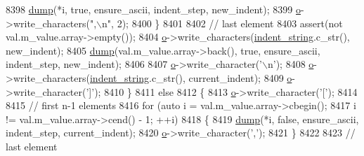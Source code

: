 \begin{DoxyCode}
8398                         \hyperlink{classnlohmann_1_1detail_1_1serializer_a95460ebd1a535a543e5a0ec52e00f48b}{dump}(*i, \textcolor{keyword}{true}, ensure\_ascii, indent\_step, new\_indent);
8399                         \hyperlink{classnlohmann_1_1detail_1_1serializer_acf3c88660d3cbc65fc71c4d84f2a9f59}{o}->write\_characters(\textcolor{stringliteral}{",\(\backslash\)n"}, 2);
8400                     \}
8401 
8402                     \textcolor{comment}{// last element}
8403                     assert(not val.m\_value.array->empty());
8404                     \hyperlink{classnlohmann_1_1detail_1_1serializer_acf3c88660d3cbc65fc71c4d84f2a9f59}{o}->write\_characters(\hyperlink{classnlohmann_1_1detail_1_1serializer_ae9268a10d88a5526e32735a55a132fc6}{indent\_string}.c\_str(), new\_indent);
8405                     \hyperlink{classnlohmann_1_1detail_1_1serializer_a95460ebd1a535a543e5a0ec52e00f48b}{dump}(val.m\_value.array->back(), \textcolor{keyword}{true}, ensure\_ascii, indent\_step, new\_indent);
8406 
8407                     \hyperlink{classnlohmann_1_1detail_1_1serializer_acf3c88660d3cbc65fc71c4d84f2a9f59}{o}->write\_character(\textcolor{charliteral}{'\(\backslash\)n'});
8408                     \hyperlink{classnlohmann_1_1detail_1_1serializer_acf3c88660d3cbc65fc71c4d84f2a9f59}{o}->write\_characters(\hyperlink{classnlohmann_1_1detail_1_1serializer_ae9268a10d88a5526e32735a55a132fc6}{indent\_string}.c\_str(), current\_indent);
8409                     \hyperlink{classnlohmann_1_1detail_1_1serializer_acf3c88660d3cbc65fc71c4d84f2a9f59}{o}->write\_character(\textcolor{charliteral}{']'});
8410                 \}
8411                 \textcolor{keywordflow}{else}
8412                 \{
8413                     \hyperlink{classnlohmann_1_1detail_1_1serializer_acf3c88660d3cbc65fc71c4d84f2a9f59}{o}->write\_character(\textcolor{charliteral}{'['});
8414 
8415                     \textcolor{comment}{// first n-1 elements}
8416                     \textcolor{keywordflow}{for} (\textcolor{keyword}{auto} i = val.m\_value.array->cbegin();
8417                             i != val.m\_value.array->cend() - 1; ++i)
8418                     \{
8419                         \hyperlink{classnlohmann_1_1detail_1_1serializer_a95460ebd1a535a543e5a0ec52e00f48b}{dump}(*i, \textcolor{keyword}{false}, ensure\_ascii, indent\_step, current\_indent);
8420                         \hyperlink{classnlohmann_1_1detail_1_1serializer_acf3c88660d3cbc65fc71c4d84f2a9f59}{o}->write\_character(\textcolor{charliteral}{','});
8421                     \}
8422 
8423                     \textcolor{comment}{// last element}

\end{DoxyCode}
